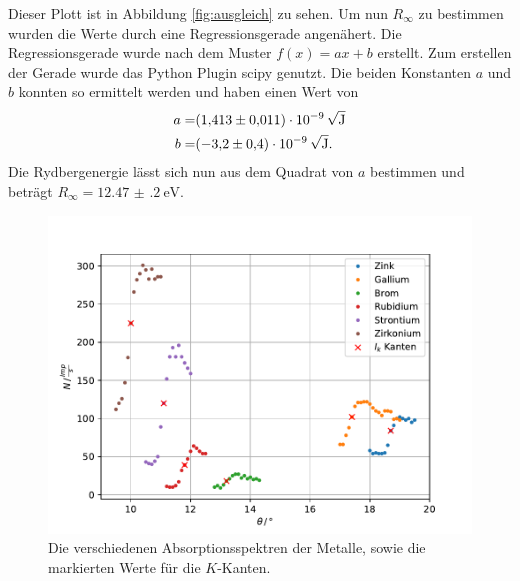 Dieser Plott ist in Abbildung \ref{fig:ausgleich} zu sehen.
Um nun $R_\infty$ zu bestimmen wurden die Werte durch eine Regressionsgerade angenähert.
Die Regressionsgerade wurde nach dem Muster $f(x) = ax+b$ erstellt.
Zum erstellen der Gerade wurde das Python Plugin scipy \cite{scipy} genutzt.
Die beiden Konstanten $a$ und $b$ konnten so ermittelt werden und haben einen Wert von 
\begin{align*}
  a =& \SI{1.413(11)e-09}{\sqrt{\J}}\\
  b=& \SI{-3.2(4)e-09}{\sqrt{\J}}.\\
\end{align*}
Die Rydbergenergie lässt sich nun aus dem Quadrat von $a$ bestimmen und beträgt $R_\infty = \SI{12.47(20)}{\eV}$.


\begin{figure}
  \centering
  \includegraphics[width=\textwidth]{content/data/verschmetalle.pdf}
  \caption{Die verschiedenen Absorptionsspektren der Metalle, sowie die markierten Werte für die $K$-Kanten.}
  \label{fig:versch}
\end{figure}

